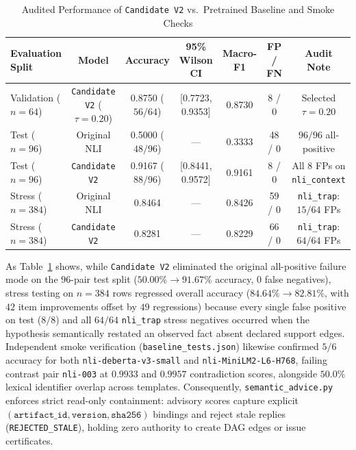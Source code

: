 \documentclass[11pt,a4paper]{article}
\begin{document}
\begin{table}[t]
\centering
\caption{Audited Performance of \texttt{Candidate V2} vs.\ Pretrained Baseline and Smoke Checks}
\label{tab:v2-audit}
\small
\begin{tabular}{@{}lcccccc@{}}
\toprule
\textbf{Evaluation Split} & \textbf{Model} & \textbf{Accuracy} & \textbf{95\% Wilson CI} & \textbf{Macro-F1} & \textbf{FP / FN} & \textbf{Audit Note} \\
\midrule
Validation ($n=64$) & \texttt{Candidate V2} ($\tau=0.20$) & 0.8750 ($56/64$) & [0.7723, 0.9353] & 0.8730 & 8 / 0 & Selected $\tau=0.20$ \\
Test ($n=96$)       & Original NLI                      & 0.5000 ($48/96$) & ---              & 0.3333 & 48 / 0 & $96/96$ all-positive \\
Test ($n=96$)       & \texttt{Candidate V2}             & 0.9167 ($88/96$) & [0.8441, 0.9572] & 0.9161 & 8 / 0 & All 8 FPs on \texttt{nli\_context} \\
Stress ($n=384$)    & Original NLI                      & 0.8464           & ---              & 0.8426 & 59 / 0 & \texttt{nli\_trap}: $15/64$ FPs \\
Stress ($n=384$)    & \texttt{Candidate V2}             & 0.8281           & ---              & 0.8229 & 66 / 0 & \texttt{nli\_trap}: $64/64$ FPs \\
\bottomrule
\end{tabular}
\end{table}

As Table~\ref{tab:v2-audit} shows, while \texttt{Candidate V2} eliminated the original all-positive failure mode on the $96$-pair test split ($50.00\% \rightarrow 91.67\%$ accuracy, $0$ false negatives), stress testing on $n=384$ rows regressed overall accuracy ($84.64\% \rightarrow 82.81\%$, with $42$ item improvements offset by $49$ regressions) because every single false positive on test ($8/8$) and all $64/64$ \texttt{nli\_trap} stress negatives occurred when the hypothesis semantically restated an observed fact absent declared support edges. Independent smoke verification (\texttt{baseline\_tests.json}) likewise confirmed $5/6$ accuracy for both \texttt{nli-deberta-v3-small} and \texttt{nli-MiniLM2-L6-H768}, failing contrast pair \texttt{nli-003} at $0.9933$ and $0.9957$ contradiction scores, alongside $50.0\%$ lexical identifier overlap across templates. Consequently, \texttt{semantic\_advice.py} enforces strict read-only containment: advisory scores capture explicit $(\texttt{artifact\_id}, \texttt{version}, \texttt{sha256})$ bindings and reject stale replies (\texttt{REJECTED\_STALE}), holding zero authority to create DAG edges or issue certificates.



\end{document}
